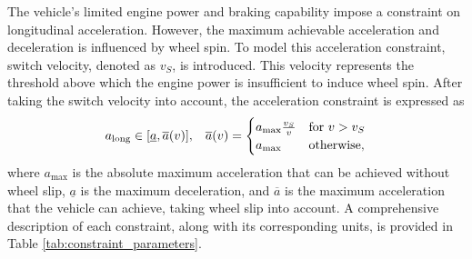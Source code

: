 The vehicle's limited engine power and braking capability impose a constraint on longitudinal acceleration. 
However, the maximum achievable acceleration and deceleration is influenced by wheel spin. 
To model this acceleration constraint, switch velocity, denoted as $v_S$, is introduced. 
This velocity represents the threshold above which the engine power is insufficient to induce wheel spin. 
After taking the switch velocity into account, the acceleration constraint is expressed as
\begin{equation}
    a_{\text{long}} \in [\underline{a}, \overline{a}(v)], \hspace{0.3cm} 
    \overline{a}(v) = 
    \begin{cases}
        a_{\text{max}} \frac{v_{S}}{v} & \text{for } v > v_{S} \\
        a_{\text{max}} & \text{otherwise},
    \end{cases}
\label{eq:accl_constraint}
\end{equation}
where $a_{\text{max}}$ is the absolute maximum acceleration that can be achieved without wheel slip, $\underline{a}$ is the maximum deceleration, and $\overline{a}$ is the maximum acceleration that the vehicle can achieve, taking wheel slip into account.
A comprehensive description of each constraint, along with its corresponding units, is provided in Table \ref{tab:constraint_parameters}.




